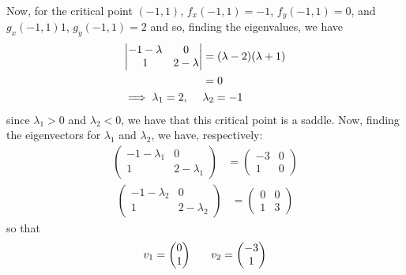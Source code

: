 \documentclass{article}
\begin{document}
\begin{itemize}
\begin{itemize}
        Now, for the critical point $(-1,1)$, $f_x(-1,1) = -1$, $f_y(-1,1) = 0$, and $g_x(-1,1)1$, $g_y(-1,1) = 2$ and so, finding the eigenvalues, we have
        \begin{align*}
            \left|\begin{matrix}
                -1 - \lambda & 0\\
                1 & 2 - \lambda
            \end{matrix}\right| &= (\lambda - 2)(\lambda + 1)\\
            &= 0\\
            \implies \lambda_1 = 2, \hspace{0.5cm} &\lambda_2 = -1
        \end{align*}
        since $\lambda_1 > 0$ and $\lambda_2 < 0$, we have that this critical point is a saddle. Now, finding the eigenvectors for $\lambda_1$ and $\lambda_2$, we have, respectively:
        \begin{align*}
            \begin{pmatrix}
                -1 - \lambda_1 & 0\\
                1 & 2 - \lambda_1
            \end{pmatrix} &= \begin{pmatrix}
                -3 & 0\\
                1 & 0
            \end{pmatrix}
        \end{align*}     
        \begin{align*}
            \begin{pmatrix}
                -1 - \lambda_2 & 0\\
                1 & 2 - \lambda_2
            \end{pmatrix} &= \begin{pmatrix}
                0 & 0\\
                1 & 3
            \end{pmatrix}
        \end{align*}
        so that
        \[v_1 = \begin{pmatrix}
            0\\
            1
        \end{pmatrix} \hspace{0.6cm} v_2 = \begin{pmatrix}
            -3\\
            1
        \end{pmatrix}\]
        


\end{itemize}
\end{itemize}
\end{document}

